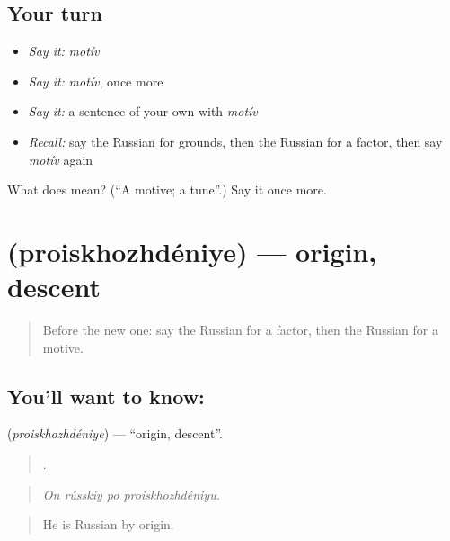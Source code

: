 \subsection*{Your turn}
\begin{itemize}
\raggedright
  \item \emph{Say it:} \emph{motív}
  \item \emph{Say it:} \emph{motív}, once more
  \item \emph{Say it:} a sentence of your own with \emph{motív}
  \item \emph{Recall:} say the Russian for grounds, then the Russian for a factor, then say \emph{motív} again
\end{itemize}

\begin{tcolorbox}[breakable,colback=teal!4,colframe=teal!35!black,title={Before you move on}]
What does  mean? (\textquotedblleft{}A motive; a tune\textquotedblright{}.) Say it once more.
\end{tcolorbox}
\section[\texorpdfstring{\ru{происхождение} (proiskhozhdéniye)}{происхождение (proiskhozhdéniye)}]{ (proiskhozhdéniye) — origin, descent}

\label{lesson:RU-C348-proiskhozhdenie}



\begin{quote}
Before the new one: say the Russian for a factor, then the Russian for a motive.
\end{quote}

\subsection*{You'll want to know: }
\textbf{} (\emph{proiskhozhdéniye}) — \textquotedblleft{}origin, descent\textquotedblright{}.

\begin{quote}
   .
\end{quote}

\begin{quote}
\emph{On rússkiy po proiskhozhdéniyu.}
\end{quote}

\begin{quote}
He is Russian by origin.
\end{quote}

